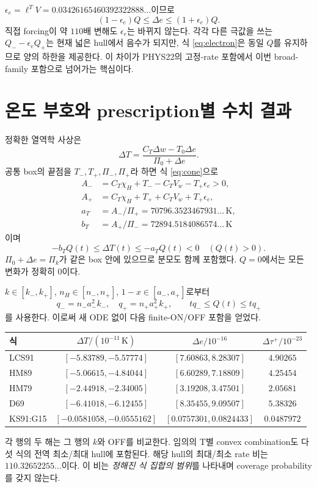 \documentclass[11pt,a4paper]{article}
\begin{document}
$\epsilon_e=\ell^TV=0.03426165460392322888\ldots$이므로
\begin{equation}\label{eq:electron}
(1-\epsilon_e)Q\le\Delta e\le(1+\epsilon_e)Q.
\end{equation}
직접 forcing이 약 $110$배 변해도 $\epsilon_e$는 바뀌지 않는다. 각각 다른 극값을 쓰는 $Q_- -\epsilon_e Q_+$는 현재 넓은 hull에서 음수가 되지만, 식 \eqref{eq:electron}은 동일 $Q$를 유지하므로 양의 하한을 제공한다. 이 차이가 PHYS22의 고정-rate 포함에서 이번 broad-family 포함으로 넘어가는 핵심이다.

\newpage
\section{온도 부호와 prescription별 수치 결과}
정확한 열역학 사상은
\begin{equation}
\Delta T=\frac{C_T\Delta w-T_0\Delta e}{\Pi_0+\Delta e}.
\end{equation}
공통 box의 끝점을 $T_-,T_+,\Pi_-,\Pi_+$라 하면 식 \eqref{eq:cone}으로
\begin{align}
A_-&=C_T\chi_H+T_- -C_TV_w-T_+\epsilon_e>0,\\
A_+&=C_T\chi_H+T_+ +C_TV_w+T_+\epsilon_e,\\
a_T&=A_-/\Pi_+=70796.3523467931\ldots\,\mathrm K,\\
b_T&=A_+/\Pi_-=72894.5184086574\ldots\,\mathrm K
\end{align}
이며
\begin{equation}\label{eq:temp}
-b_TQ(t)\le\Delta T(t)\le-a_TQ(t)<0\quad (Q(t)>0).
\end{equation}
$\Pi_0+\Delta e=\Pi_k$가 같은 box 안에 있으므로 분모도 함께 포함했다. $Q=0$에서는 모든 변화가 정확히 0이다.

$k\in[k_-,k_+]$, $n_H\in[n_-,n_+]$, $1-x\in[a_-,a_+]$로부터
\begin{equation}
q_-=n_-a_-^2k_-,\quad q_+=n_+a_+^2k_+,\qquad tq_-\le Q(t)\le tq_+
\end{equation}
를 사용한다. 이로써 새 ODE 없이 다음 finite-ON/OFF 포함을 얻었다.

\begin{center}\small
\begin{tabular}{@{}lccc@{}}\toprule
식 & $\Delta T/(10^{-11}\,\mathrm K)$ & $\Delta e/10^{-16}$ & $\Delta\tau^+/10^{-23}$\\\midrule
LCS91 & $[-5.83789,-5.57774]$ & $[7.60863,8.28307]$ & $4.90265$\\
HM89 & $[-5.06615,-4.84044]$ & $[6.60289,7.18809]$ & $4.25454$\\
HM79 & $[-2.44918,-2.34005]$ & $[3.19208,3.47501]$ & $2.05681$\\
D69 & $[-6.41018,-6.12455]$ & $[8.35455,9.09507]$ & $5.38326$\\
KS91:G15 & $[-0.0581058,-0.0555162]$ & $[0.0757301,0.0824433]$ & $0.0487972$\\\bottomrule
\end{tabular}\end{center}
각 행의 두 해는 그 행의 $k$와 OFF를 비교한다. 임의의 T별 convex combination도 다섯 식의 전역 최소/최대 hull에 포함된다. 해당 hull의 최대/최소 rate 비는 $110.32652255\ldots$이다. 이 비는 \emph{정해진 식 집합의 범위}를 나타내며 coverage probability를 갖지 않는다.
\end{document}
